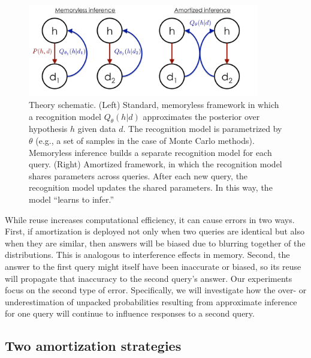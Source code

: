 \begin{figure}
\centering
\includegraphics[width=0.9\textwidth]{figures/amortization_schematic.pdf}
\caption{Theory schematic. (Left) Standard, memoryless framework in which a recognition model $Q_\theta(h|d)$ approximates the posterior over hypothesis $h$ given data $d$. The recognition model is parametrized by $\theta$ (e.g., a set of samples in the case of Monte Carlo methods). Memoryless inference builds a separate recognition model for each query. (Right) Amortized framework, in which the recognition model shares parameters across queries. After each new query, the recognition model updates the shared parameters. In this way, the model ``learns to infer.''}
\label{fig:schematic}
\end{figure}

While reuse increases computational efficiency, it can cause errors in two ways. First, if amortization is deployed not only when two queries are identical but also when they are similar, then answers will be biased due to blurring together of the distributions. This is analogous to interference effects in memory. Second, the answer to the first query might itself have been inaccurate or biased, so its reuse will propagate that inaccuracy to the second query's answer. Our experiments focus on the second type of error. Specifically, we will investigate how the over- or underestimation of unpacked probabilities resulting from approximate inference for one query will continue to influence responses to a second query. 

\subsection{Two amortization strategies}

